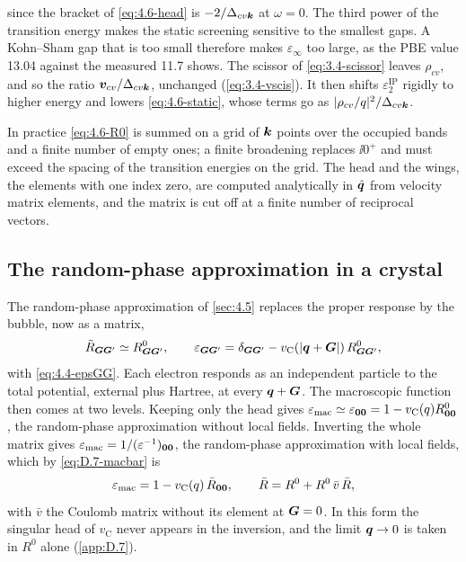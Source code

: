 since the bracket of \cref{eq:4.6-head} is $-2/\Delta_{cv\bm{k}}$ at $\omega = 0$. The third power of the transition energy makes the static screening sensitive to the smallest gaps. A Kohn--Sham gap that is too small therefore makes $\varepsilon_\infty$ too large, as the PBE value 13.04 against the measured 11.7 shows. The scissor of \cref{eq:3.4-scissor} leaves $\rho_{cv}$, and so the ratio $\bm{v}_{cv}/\Delta_{cv\bm{k}}$, unchanged (\cref{eq:3.4-vscis}). It then shifts $\varepsilon_2^{\mathrm{IP}}$ rigidly to higher energy and lowers \cref{eq:4.6-static}, whose terms go as $|\rho_{cv}/q|^2/\Delta_{cv\bm{k}}$.

In practice \cref{eq:4.6-R0} is summed on a grid of $\bm{k}$ points over the occupied bands and a finite number of empty ones; a finite broadening replaces $\ii0^+$ and must exceed the spacing of the transition energies on the grid. The head and the wings, the elements with one index zero, are computed analytically in $\hat{\bm{q}}$ from velocity matrix elements, and the matrix is cut off at a finite number of reciprocal vectors.

\subsection{The random-phase approximation in a crystal}

The random-phase approximation of \cref{sec:4.5} replaces the proper response by the bubble, now as a matrix,
\begin{equation}
  \tilde R_{\bm{G}\bm{G}'} \simeq R^0_{\bm{G}\bm{G}'}, \qquad
  \varepsilon_{\bm{G}\bm{G}'} = \delta_{\bm{G}\bm{G}'} - v_{\mathrm{C}}(|\bm{q}+\bm{G}|)\,R^0_{\bm{G}\bm{G}'} ,
  \label{eq:4.6-rpa}
\end{equation}
with \cref{eq:4.4-epsGG}. Each electron responds as an independent particle to the total potential, external plus Hartree, at every $\bm{q} + \bm{G}$. The macroscopic function then comes at two levels. Keeping only the head gives $\varepsilon_{\mathrm{mac}} \simeq \varepsilon_{\bm{0}\bm{0}} = 1 - v_{\mathrm{C}}(q)R^0_{\bm{0}\bm{0}}$, the random-phase approximation without local fields. Inverting the whole matrix gives $\varepsilon_{\mathrm{mac}} = 1/(\varepsilon^{-1})_{\bm{0}\bm{0}}$, the random-phase approximation with local fields, which by \cref{eq:D.7-macbar} is
\begin{equation}
  \varepsilon_{\mathrm{mac}} = 1 - v_{\mathrm{C}}(q)\,\bar R_{\bm{0}\bm{0}}, \qquad \bar R = R^0 + R^0\,\bar v\,\bar R ,
  \label{eq:4.6-rpaLF}
\end{equation}
with $\bar v$ the Coulomb matrix without its element at $\bm{G} = 0$. In this form the singular head of $v_{\mathrm{C}}$ never appears in the inversion, and the limit $\bm{q} \to 0$ is taken in $R^0$ alone (\cref{app:D.7}).

